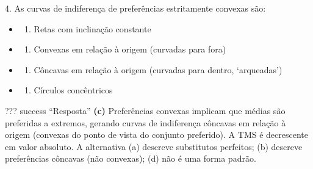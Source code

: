 \documentclass[11pt,twoside,openright]{book}
\providecommand{\tightlist}{\setlength{\itemsep}{0pt}\setlength{\parskip}{0pt}}
\begin{document}
\begin{infobox}{4. As curvas de indiferença de preferências estritamente convexas são:}

\begin{itemize}
\tightlist
\item
  \begin{enumerate}
  \def\labelenumi{(\alph{enumi})}
  \tightlist
  \item
    Retas com inclinação constante
  \end{enumerate}
\item
  \begin{enumerate}
  \def\labelenumi{(\alph{enumi})}
  \setcounter{enumi}{1}
  \tightlist
  \item
    Convexas em relação à origem (curvadas para fora)
  \end{enumerate}
\item
  \begin{enumerate}
  \def\labelenumi{(\alph{enumi})}
  \setcounter{enumi}{2}
  \tightlist
  \item
    Côncavas em relação à origem (curvadas para dentro, `arqueadas')
  \end{enumerate}
\item
  \begin{enumerate}
  \def\labelenumi{(\alph{enumi})}
  \setcounter{enumi}{3}
  \tightlist
  \item
    Círculos concêntricos
  \end{enumerate}
\end{itemize}

??? success ``Resposta'' \textbf{(c)} Preferências convexas implicam que
médias são preferidas a extremos, gerando curvas de indiferença côncavas
em relação à origem (convexas do ponto de vista do conjunto preferido).
A TMS é decrescente em valor absoluto. A alternativa (a) descreve
substitutos perfeitos; (b) descreve preferências côncavas (não
convexas); (d) não é uma forma padrão.

\end{infobox}
\end{document}
